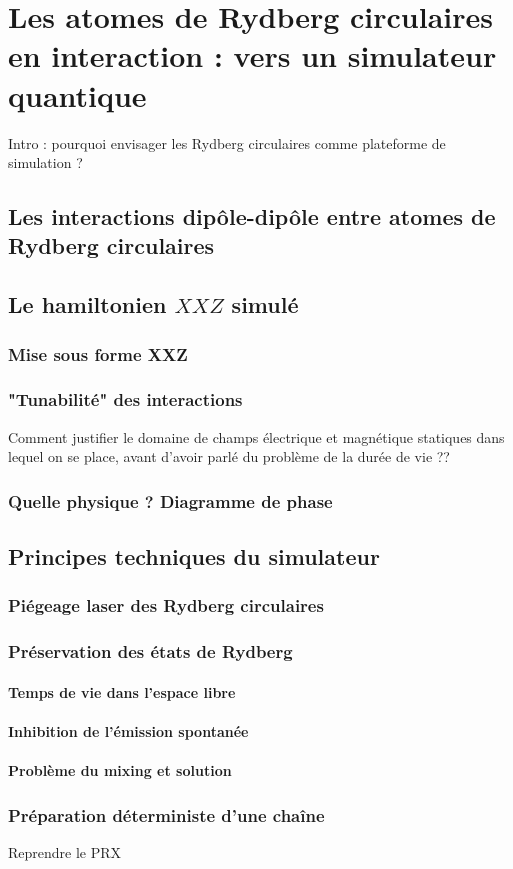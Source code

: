 \chapter{Les atomes de Rydberg circulaires en interaction : vers un simulateur quantique}
\label{chapter:circsim}

Intro : pourquoi envisager les Rydberg circulaires comme plateforme de simulation ?

\section{Les interactions dipôle-dipôle entre atomes de Rydberg circulaires}

\section{Le hamiltonien $XXZ$ simulé}
	\subsection{Mise sous forme XXZ}
	\subsection{"Tunabilité" des interactions}
		Comment justifier le domaine de champs électrique et magnétique statiques dans lequel on se place, avant d'avoir parlé du problème de la durée de vie ??
	\subsection{Quelle physique ? Diagramme de phase}

\section{Principes techniques du simulateur}
	\subsection{Piégeage laser des Rydberg circulaires}
	\subsection{Préservation des états de Rydberg}
		\subsubsection*{Temps de vie dans l'espace libre}
		\subsubsection*{Inhibition de l'émission spontanée}
		\subsubsection*{Problème du mixing et solution}
	\subsection{Préparation déterministe d'une chaîne}

\newpage
Reprendre le PRX